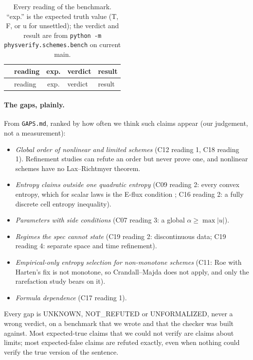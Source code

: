 \documentclass[11pt,a4paper]{article}
\newcommand{\code}[1]{\texttt{#1}}
\newcommand{\NR}{\textsf{NOT\_REFUTED}}
\newcommand{\U}{\textsf{UNKNOWN}}
\newcommand{\UF}{\textsf{UNFORMALIZED}}
\begin{document}
{\small
\setlength{\tabcolsep}{4pt}
\begin{longtable}{@{}l >{\raggedright\arraybackslash}p{7.8cm} c l l@{}}
\caption{Every reading of the benchmark. ``exp.'' is the expected truth value (T, F, or u for
unsettled); the verdict and result are from
\code{python -m physverify.schemes.bench} on current main.}\label{tab:bench}\\
\toprule
& reading & exp. & verdict & result \\ \midrule\endfirsthead
\toprule & reading & exp. & verdict & result \\ \midrule\endhead

\end{longtable}}

\paragraph{The gaps, plainly.} From \code{GAPS.md}, ranked by how often we think such claims appear
(our judgement, not a measurement):
\begin{itemize}
\item \emph{Global order of nonlinear and limited schemes} (C12 reading 1, C18 reading 1). Refinement
  studies can refute an order but never prove one, and nonlinear schemes have no Lax--Richtmyer theorem.
\item \emph{Entropy claims outside one quadratic entropy} (C09 reading 2: every convex entropy, which
  for scalar laws is the E-flux condition \cite{osher1984}; C16 reading 2: a fully discrete cell entropy
  inequality).
\item \emph{Parameters with side conditions} (C07 reading 3: a global $\alpha \ge \max|u|$).
\item \emph{Regimes the spec cannot state} (C19 reading 2: discontinuous data; C19 reading 4: separate
  space and time refinement).
\item \emph{Empirical-only entropy selection for non-monotone schemes} (C11: Roe with Harten's fix is
  not monotone, so Crandall--Majda does not apply, and only the rarefaction study bears on it).
\item \emph{Formula dependence} (C17 reading 1).
\end{itemize}
Every gap is \U, \NR{} or \UF, never a wrong verdict, on a benchmark that we wrote and that the checker
was built against. Most expected-true claims that we could not
verify are claims about limits; most expected-false claims are refuted exactly, even when nothing could
verify the true version of the sentence.
\end{document}
